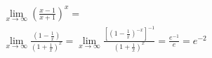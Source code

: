 \begin{ex}
\begin{align}
&\lim_{x\rightarrow \infty} \left(\frac{x-1}{x+1}\right)^x=\nonumber\\
&\lim_{x\rightarrow \infty} \frac{\left(1-\frac{1}{x}\right)}{\left(1+\frac{1}{x}\right)^x}=\lim_{x\rightarrow \infty} \frac{\left[\left(1-\frac{1}{x}\right)^{-x}\right]^{-1}}{\left(1+\frac{1}{x}\right)^x}=\frac{e^{-1}}{e}=e^{-2}\nonumber
\end{align}
\end{ex}